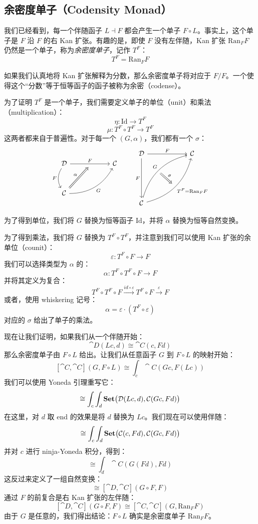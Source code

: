 \documentclass[DaoFP]{subfiles}
\begin{document}
\subsection{余密度单子（Codensity Monad）}

我们已经看到，每一个伴随函子 $L \dashv F$ 都会产生一个单子 $F \circ L$。事实上，这个单子是 $F$ 沿 $F$ 的右 Kan 扩张。有趣的是，即使 $F$ 没有左伴随，Kan 扩张 $\text{Ran}_F F$ 仍然是一个单子，称为\emph{余密度单子}，记作 $T^F$：
\[ T^F = \text{Ran}_F F \]

如果我们认真地将 Kan 扩张解释为分数，那么余密度单子将对应于 $F/F$。一个使得这个“分数”等于恒等函子的函子被称为余密（codense）。

为了证明 $T^F$ 是一个单子，我们需要定义单子的单位（unit）和乘法（multiplication）：
\[ \eta \colon \text{Id} \to T^F \]
\[ \mu \colon T^F \circ T^F \to  T^F \]
这两者都来自于普遍性。对于每一个 $(G, \alpha)$，我们都有一个 $\sigma$：
\[
 \begin{tikzcd} [row sep=1cm, column sep=1cm]
 \cat D
 \arrow[rr, "F", "" {name=ID, below} ]
 \arrow[d, bend right, "F"']
 && \cat C
 \\
 \cat C
  \arrow[urr, bend right, "G"']
 \arrow[Rightarrow, "\alpha",  to=ID]
 \end{tikzcd}
 \qquad
\begin{tikzcd}[row sep=2cm, column sep=2cm]
\cat D  \ar[d, "F"', "" {name=P}]
            \ar[r, "F", ""  {name=F, below, near start, bend right}]
&
\cat C
\\
\cat C
    \ar[ur, bend left, "G", "" {name=G, below}]
    \ar[ur, bend right, "T^F = \text{Ran}_F F"', "" {name=Ran}]
\arrow[Rightarrow, "\sigma", from=G, to=Ran]
\end{tikzcd}
\]

为了得到单位，我们将 $G$ 替换为恒等函子 $\text{Id}$，并将 $\alpha$ 替换为恒等自然变换。

为了得到乘法，我们将 $G$ 替换为 $T^F \circ T^F$，并注意到我们可以使用 Kan 扩张的余单位（counit）：
\[ \varepsilon \colon  T^F \circ F \to F \]
我们可以选择类型为 $\alpha$ 的：
\[ \alpha \colon T^F \circ T^F \circ F \to F \]
并将其定义为复合：
\[ T^F \circ T^F \circ F \xrightarrow{id \circ \varepsilon} T^F \circ F \xrightarrow{\varepsilon} F\]
或者，使用 whiskering 记号：
\[ \alpha = \varepsilon \cdot (T^F \circ \varepsilon) \]
对应的 $\sigma$ 给出了单子的乘法。

现在让我们证明，如果我们从一个伴随开始：
\[ \cat D(L c, d) \cong \cat C (c, F d) \]
那么余密度单子由 $F \circ L$ 给出。让我们从任意函子 $G$ 到 $F \circ L$ 的映射开始：
\[ [\cat C, \cat C](G, F \circ L) \cong  \int_c \cat C (G c, F (L c)) \]
我们可以使用 Yoneda 引理重写它：
\[ \cong \int_c \int_d \mathbf{Set}\big(\mathcal{D}(L c, d), \mathcal{C} (G c, F d)\big) \]
在这里，对 $d$ 取 end 的效果是将 $d$ 替换为 $L c$。我们现在可以使用伴随：
\[ \cong \int_c \int_d \mathbf{Set}\big(\mathcal{C}(c, F d), \mathcal{C} (G c, F d)\big) \]
并对 $c$ 进行 ninja-Yoneda 积分，得到：
\[ \cong \int_d \cat C (G (F d), F d) \]
这反过来定义了一组自然变换：
\[ \cong [\cat D, \cat C](G \circ F, F) \]
通过 $F$ 的前复合是右 Kan 扩张的左伴随：
\[ [\cat D, \cat C](G \circ F, F) \cong  [\cat C, \cat C] (G, \text{Ran}_F F)\]
由于 $G$ 是任意的，我们得出结论：$F \circ L$ 确实是余密度单子 $\text{Ran}_F F$。
\end{document}
